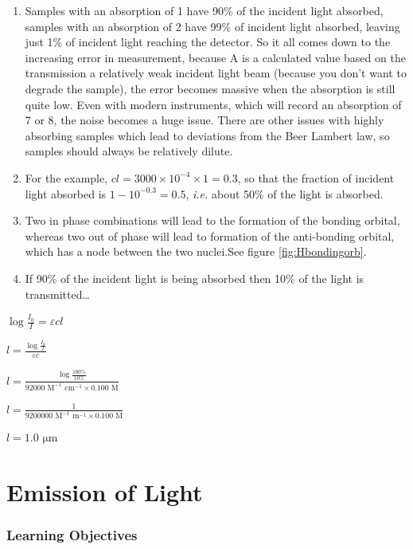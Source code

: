 \documentclass[
]{book}
\begin{document}
\begin{enumerate}
\def\labelenumi{\arabic{enumi}.}
\setcounter{enumi}{4}
\item
  Samples with an absorption of 1 have 90\% of the incident light absorbed, samples with an absorption of 2 have 99\% of incident light absorbed, leaving just 1\% of incident light reaching the detector. So it all comes down to the increasing error in measurement, because A is a calculated value based on the transmission a relatively weak incident light beam (because you don't want to degrade the sample), the error becomes massive when the absorption is still quite low. Even with modern instruments, which will record an absorption of 7 or 8, the noise becomes a huge issue. There are other issues with highly absorbing samples which lead to deviations from the Beer Lambert law, so samples should always be relatively dilute.
\item
  For the example, \(cl = 3000 \times 10^{-4} \times 1 = 0.3\), so that the fraction of incident light absorbed is
  \(1 - 10^{-0.3} = 0.5\), \emph{i.e.} about 50\% of the light is absorbed.
\item
  Two in phase combinations will lead to the formation of the bonding orbital, whereas two out of phase will lead to formation of the anti-bonding orbital, which has a node between the two nuclei.See figure \ref{fig:Hbondingorb}.
\item
  If 90\% of the incident light is being absorbed then 10\% of the light is transmitted\ldots{}
\end{enumerate}

\(\log \frac{I_0}{I}=\varepsilon cl\)

\(l=\frac{ \log \frac{I_0}{I}}{\varepsilon c}\)

\(l=\frac{\log \frac{100 \%}{10 \%}}{92000 \textrm{ M}^{−1} \textrm{ cm}^{−1} \times 0.100 \textrm{ M}}\)

\(l=\frac{1}{9200000 \textrm{ M}^{−1} \textrm{ m}^{−1} \times 0.100 \textrm{ M}}\)

\(l = 1.0 \textrm{ μm}\)

\hypertarget{ch:Em}{%
\chapter{Emission of Light}\label{ch:Em}}

\hypertarget{sec:EmLOs}{%
\subsection{Learning Objectives}\label{sec:EmLOs}}
\end{document}
